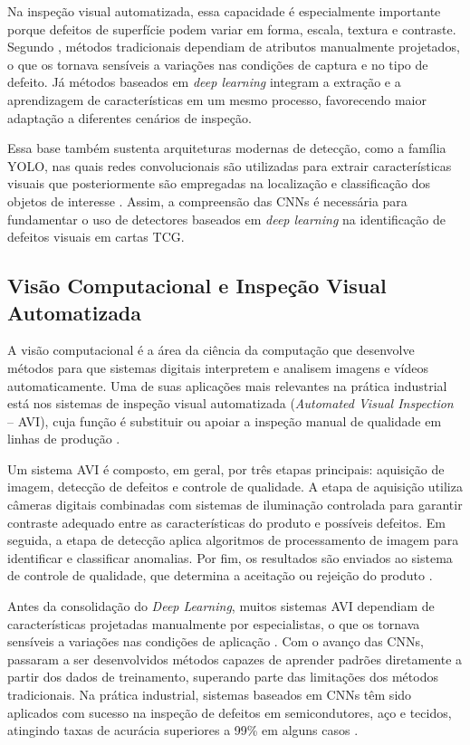 \documentclass[
    12pt,                %
    openright,           %
    oneside,             %
    a4paper,             %
    english,             %
    brazil               %
]{abntex2}
\begin{document}
Na inspeção visual automatizada, essa capacidade é especialmente importante
porque defeitos de superfície podem variar em forma, escala, textura e contraste.
Segundo , métodos tradicionais dependiam de atributos
manualmente projetados, o que os tornava sensíveis a variações nas condições de
captura e no tipo de defeito. Já métodos baseados em \textit{deep learning}
integram a extração e a aprendizagem de características em um mesmo processo,
favorecendo maior adaptação a diferentes cenários de inspeção.

Essa base também sustenta arquiteturas modernas de detecção, como a família
YOLO, nas quais redes convolucionais são utilizadas para extrair características
visuais que posteriormente são empregadas na localização e classificação dos
objetos de interesse \cite{Hussain2023}. Assim, a compreensão das CNNs é
necessária para fundamentar o uso de detectores baseados em \textit{deep learning}
na identificação de defeitos visuais em cartas TCG.


\subsection{Visão Computacional e Inspeção Visual Automatizada}
\label{subsec:avi}

A visão computacional é a área da ciência da computação que desenvolve 
métodos para que sistemas digitais interpretem e analisem imagens e 
vídeos automaticamente. Uma de suas aplicações mais relevantes na prática 
industrial está nos sistemas de inspeção visual automatizada 
(\textit{Automated Visual Inspection} -- AVI), cuja função é substituir 
ou apoiar a inspeção manual de qualidade em linhas de produção 
\cite{Zheng2021}.

Um sistema AVI é composto, em geral, por três etapas principais: aquisição 
de imagem, detecção de defeitos e controle de qualidade. A etapa de 
aquisição utiliza câmeras digitais combinadas com sistemas de iluminação 
controlada para garantir contraste adequado entre as características do 
produto e possíveis defeitos. Em seguida, a etapa de detecção aplica 
algoritmos de processamento de imagem para identificar e classificar 
anomalias. Por fim, os resultados são enviados ao sistema de controle 
de qualidade, que determina a aceitação ou rejeição do produto 
\cite{Zheng2021}.

Antes da consolidação do \textit{Deep Learning}, muitos sistemas AVI 
dependiam de características projetadas manualmente por especialistas, 
o que os tornava sensíveis a variações nas condições de aplicação 
\cite{Zheng2021}. Com o avanço das CNNs, passaram a ser desenvolvidos 
métodos capazes de aprender padrões diretamente a partir dos dados de 
treinamento, superando parte das limitações dos métodos tradicionais. 
Na prática industrial, sistemas baseados em CNNs têm sido aplicados com 
sucesso na inspeção de defeitos em semicondutores, aço e tecidos, 
atingindo taxas de acurácia superiores a 99\% em alguns casos 
\cite{Zheng2021}.
\end{document}
